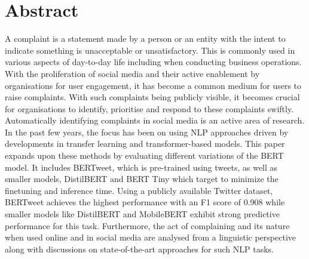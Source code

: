 \chapter*{\Large \center Abstract}

A complaint is a statement made by a person or an entity with the intent to indicate something is unacceptable or unsatisfactory. This is commonly used in various aspects of day-to-day life including when conducting business operations. With the proliferation of social media and their active enablement by organisations for user engagement, it has become a common medium for users to raise complaints. With such complaints being publicly visible, it becomes crucial for organisations to identify, prioritise and respond to these complaints swiftly. Automatically identifying complaints in social media is an active area of research. In the past few years, the focus has been on using NLP approaches driven by developments in transfer learning and transformer-based models.
\newline \newline
This paper expands upon these methods by evaluating different variations of the BERT model. It includes BERTweet, which is pre-trained using tweets, as well as smaller models, DistilBERT and BERT Tiny which target to minimize the finetuning and inference time. Using a publicly available Twitter dataset, BERTweet achieves the highest performance with an F1 score of 0.908 while smaller models like DistilBERT and MobileBERT exhibit strong predictive performance for this task. Furthermore, the act of complaining and its nature when used online and in social media are analysed from a linguistic perspective along with discussions on state-of-the-art approaches for such NLP tasks.
